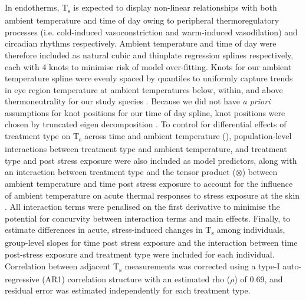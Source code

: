 \documentclass[12pt]{article}
\begin{document}
\noindent In endotherms, T\textsubscript{s} is expected to display non-linear relationships with both ambient temperature and time of day owing to peripheral thermoregulatory processes (i.e. cold-induced vasoconstriction and warm-induced vasodilation) and circadian rhythms \citep{richards_1971,cooper_2005} respectively. Ambient temperature and time of day were therefore included as natural cubic and thinplate regression splines respectively, each with 4 knots to minimise risk of model over-fitting. Knots for our ambient temperature spline were evenly spaced by quantiles to uniformly capture trends in eye region temperature at ambient temperatures below, within, and above thermoneutrality for our study species \citep{grossman_1977}. Because we did not have \textit{a priori} assumptions for knot positions for our time of day spline, knot positions were chosen by truncated eigen decomposition \citep{wood_2003}. To control for differential effects of treatment type on T\textsubscript{s} across time \citep{jerem_2015,jerem_2019} and ambient temperature (\citealt{robertson_2020a}), population-level interactions between treatment type and ambient temperature, and treatment type and post stress exposure were also included as model predictors, along with an interaction between treatment type and the tensor product ($\otimes$) between ambient temperature and time post stress exposure to account for the influence of ambient temperature on acute thermal responses to stress exposure at the skin \citep{nord_2019b}. All interaction terms were penalised on the first derivative to minimise the potential for concurvity between interaction terms and main effects. Finally, to estimate differences in acute, stress-induced changes in T\textsubscript{s} among individuals, group-level slopes for time post stress exposure and the interaction between time post-stress exposure and treatment type were included for each individual. Correlation between adjacent T\textsubscript{s} measurements was corrected using a type-I auto-regressive (AR1) correlation structure with an estimated rho ($\rho$) of 0.69, and residual error was estimated independently for each treatment type. \vspace{1cm} 
\end{document}
